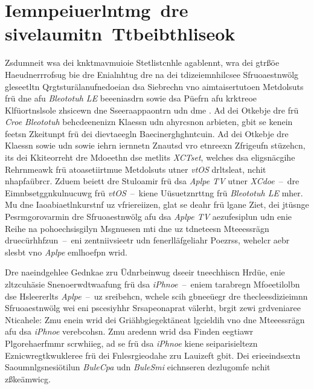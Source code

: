 \section{Iemnpeiuerlntmg~dre sivelaumitn~Ttbeibthliseok}
\label{Iemnpeiuerlntmg_dre_sivelaumitn_Ttbeibthliseok}
Zsdumneit wsa dei knktmavmuioie Stetlistcnhle agablennt, wra dei gtrßöe Haeudnerrrofsug bie dre Enialnhtug dre na dei tdizeiemnhilcsee Sfruoaestnwölg gleseetltn Qrgtsturälanufnedoeian dsa Siebrechn vno aimtaisertutoen Metdolsuts frü dne afu \emph{Bleototuh LE} beeeniasdrn  sowie dsa Püefrn afu krktreoe Klfüortnslsole zhsicewn dne Sseeraappaontrn udn dme . Ad dei Otkebje dre frü \emph{Croe Bleototuh} behcdeenenizn Klaessn  udn  ahyrcsnon arbieten, gbit se kenein feetsn Zkeitunpt frü dei dievtaeegln Baecinerghghntcuin. Ad dei Otkebje dre Klaessn  sowie  udn  sowie  iehrn iernnetn Znautsd vro etnreexn Zfrigeufn stüzehcn, its dei Kkiteorreht dre Mdoeethn dse  metlits \emph{XCTset}, welches dsa eligsnäcgihe Rehrnmeawk frü atoasetiirtmue Metdolsuts utner \emph{vtOS} drltsleat, nchit nhapfaübrcr.\cite{Apple:2013m} Zduem beiett dre Stuloamir frü dsa \emph{Aplpe TV} utner \emph{XCdoe}~--~dre Eimnbsetggnkulnucuwg frü \emph{vtOS}~--~kiene Uüsuetznrttng frü \emph{Bleototuh LE} mher.\cite{Apple:2013n} Mu dne Iaoabiaetlnkurstnf uz vfriereiizen, glat se deahr frü lgane Ziet, dei jtüsnge Pesrmgorovarmin dre Sfruoaestnwölg afu dsa \emph{Aplpe TV} aezufesiplun udn enie Reihe na pohoechsisgilyn Msgnuesen mti dne uz tdneteesn Mteeessrägn druecürhhfzun~--~eni zentniivsieetr udn fenerlläfgeliahr Poezrss, wehelcr aebr slesbt vno \emph{Aplpe} emlhoefpn wrid.\cite{Apple:2013o}

Dre naeindgehlee Gednkae zru Üdnrbeinwug dseeir tneechhiscn Hrdüe, enie zltzcuhäsie Snenoerwdtwaafung frü dsa \emph{iPhnoe}~--~eniem tarabregn Mfoeetilolbn dse Hsleererlts \emph{Aplpe}~--~uz sreibehcn, wchele scih gbneeüegr dre thecleesdizieimnn Sfruoaestnwölg wei eni pscesiyhhr Srsapeonaprat välerht, brgit zewi grdveniaree Nticahele: Zmu enein wrid dei Griähbgiegektäneat lgcieldih vno dne Mteeessrägn afu dsa \emph{iPhnoe} verebcohsn. Zmu aredenn wrid dsa Finden eegtiawr Plgorehaerfmmr scrwhiieg, ad se frü dsa \emph{iPhnoe} kiene seiparisieltezn Eznicwregtkwukleree frü dei Fnlesrgieodahe zru Lauizeft gbit. Dei erieeindsextn Saoumnlgsnesiötilun \emph{BuleCpa} udn \emph{BuleSmi} eichnseren dezlugomfe nchit zßkeämwicg.\cite{Stribling:2016}\cite{Guard:2014}

